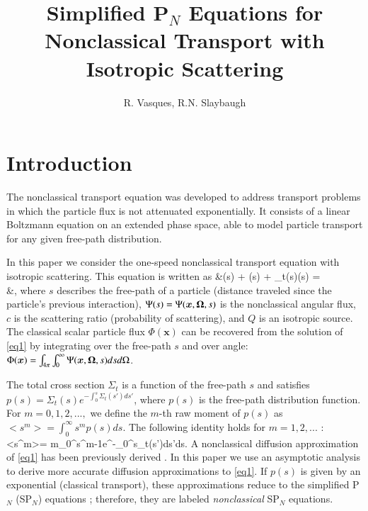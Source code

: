 \documentclass{anstrans}
\title{Simplified P$_N$ Equations for Nonclassical Transport with Isotropic Scattering}
\author{R. Vasques, R.N. Slaybaugh}
\institute{
Department of Nuclear Engineering, University of California, Berkeley, Berkeley, CA 94720-1730}
\def\bal#1\nal{\begin{align}#1\end{align}}
\newcommand{\f}{\frac}
\newcommand{\ux}{{\bm x}}
\newcommand{\unab}{{\bf \nabla}}
\newcommand{\bg}{\big>}
\newcommand{\bl}{\big<}
\newcommand{\uom}{{\bf \Omega}}
\begin{document}
\section{Introduction}

The nonclassical transport equation \cite{larvas11} was developed to address transport problems in which the particle flux is not attenuated exponentially.
It consists of a linear Boltzmann equation on an extended phase space, able to model particle transport for any given free-path distribution.

In this paper we consider the one-speed nonclassical transport equation with isotropic scattering. This equation is written as
\bal\label{eq1}
&\f{\partial \Psi}{\partial s}(s) + \uom\cdot\unab\Psi(s) + \Sigma_t(s)\Psi(s) =\\
&\qquad \f{\delta(s)}{4\pi}\left[\int_{4\pi}\int_0^\infty c\Sigma_t(s')\Psi(\ux,\uom',s')ds'd\Omega' + Q(\ux)\right],\nonumber
\nal
where $s$ describes the free-path of a particle (distance traveled since the particle's previous interaction), $\Psi(s)=\Psi(\ux,\uom,s)$ is the nonclassical angular flux, $c$ is the scattering ratio (probability of scattering), and $Q$ is an isotropic source.
The classical scalar particle flux $\Phi(\ux)$ can be recovered from the solution of \cref{eq1} by integrating over the free-path $s$ and over angle:
$\Phi(\ux) = \int_{4\pi}\int_0^\infty\Psi(\ux,\uom,s)dsd\Omega$.

The total cross section $\Sigma_t$ is a function of the free-path $s$ and satisfies $p(s)= \Sigma_t(s)e^{-\int_0^s\Sigma_t(s')ds'}$, where $p(s)$ is the free-path distribution function.
For $m=0, 1, 2,...,$ we define the $m$-th raw moment of $p(s)$ as
$\bl s^m\bg = \int_0^\infty s^mp(s)ds.$
The following identity holds for $m=1,2,...$ : 
\bal\label{eq2}
\bl s^m\bg = m\int_0^\infty s^{m-1}e^{-\int_0^s\Sigma_t(s')ds'}ds.
\nal
A nonclassical diffusion approximation of \cref{eq1} has been previously derived \cite{larvas11}.
In this paper we use an asymptotic analysis to derive more accurate diffusion approximations to \cref{eq1}.
If $p(s)$ is given by an exponential (classical transport), these approximations reduce to the simplified P$_N$ (SP$_N$) equations \cite{mcl11}; therefore, they are labeled \textit{nonclassical} SP$_N$ equations.

\end{document}
